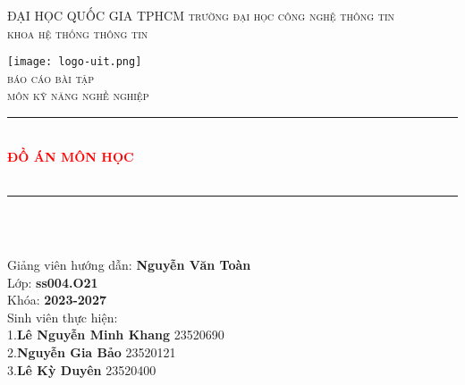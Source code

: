 \documentclass[article]{llncs}
\begin{document}
%
\begin{titlepage}

\newcommand{\HRule}{\rule{\linewidth}{0.5mm}} 

\center %
 

\textsc{\LARGE ĐẠI HỌC QUỐC GIA TPHCM }
\newline
\textsc{\LARGE trường đại học công nghệ thông tin}\\ 
\textsc{\LARGE khoa hệ thống thông tin}\\[1.5cm] 

\graphicspath{ {./logo/} }
 
\texttt{[image: logo-uit.png]}\\[1.5cm]

\textsc{\large báo cáo bài tập }\\ 
\textsc{\large môn kỹ năng nghề nghiệp }\\
[1.0cm]


\HRule \\[0.4cm]
{ \huge \bfseries  \textcolor{red}{\LARGE ĐỒ ÁN MÔN HỌC }\\}\\[0.4cm] 
\HRule \\[1.5cm]
 

\begin{minipage}{1.5\textwidth}
\begin{flushleft} \large
\emph{}\\
Giảng viên hướng dẫn: \textbf{Nguyễn Văn Toàn}\\
Lớp: \textbf{ss004.O21}\\
Khóa: \textbf{2023-2027}\\
Sinh viên thực hiện:\\
1.\textbf{Lê Nguyễn Minh Khang} 23520690 \\
2.\textbf{Nguyễn Gia Bảo} 23520121 \\
3.\textbf{Lê Kỳ Duyên} 23520400 \\


\end{flushleft}
\end{minipage}
\end{titlepage}
\end{document}
